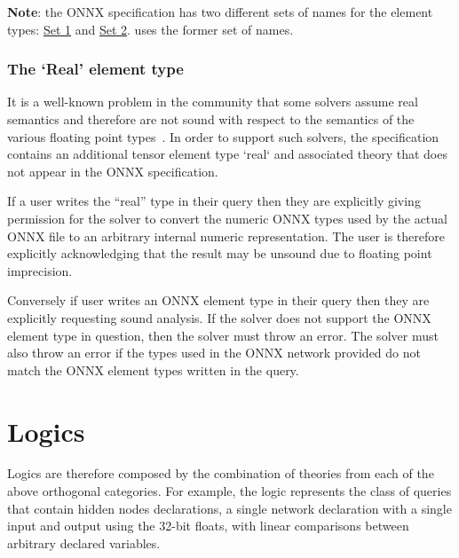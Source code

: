 \textbf{Note}: the ONNX specification has two different sets of names for the element types: \href{https://onnx.ai/onnx/repo-docs/IR.html#tensor-element-types}{Set 1} and \href{https://onnx.ai/onnx/intro/concepts.html#element-type}{Set 2}. \vnnlib{} uses the former set of names.

\subsubsection{The `Real' element type}

It is a well-known problem in the community that some solvers assume real semantics and therefore are not sound with respect to the semantics of the various floating point types~\cite{jia2021exploiting}. In order to support such solvers, the specification contains an additional tensor element type `real` and associated theory that does not appear in the ONNX specification.

If a user writes the ``real'' type in their \vnnlib{} query then they are explicitly giving permission for the solver to convert the numeric ONNX types used by the actual ONNX file to an arbitrary internal numeric representation. The user is therefore explicitly acknowledging that the result may be unsound due to floating point imprecision. 

Conversely if user writes an ONNX element type in their \vnnlib{} query then they are explicitly requesting sound analysis. If the solver does not support the ONNX element type in question, then the solver must throw an error. The solver must also throw an error if the types used in the ONNX network provided do not match the ONNX element types written in the query.

\section{Logics}

Logics are therefore composed by the combination of theories from each of the above orthogonal categories. For example, the logic  represents the class of queries that contain hidden nodes declarations, a single network declaration with a single input and output using the 32-bit floats, with linear comparisons between arbitrary declared variables.
